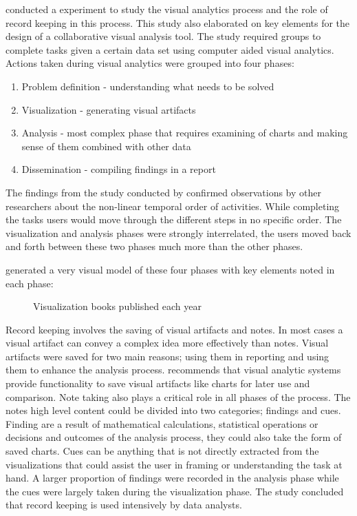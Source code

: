 \cite{mahyar2010closer} conducted a experiment to study the visual analytics process and the role of record keeping in this process. This study also elaborated on key elements for the design of a collaborative visual analysis tool. The study required groups to complete tasks given a certain data set using computer aided visual analytics.
Actions taken during visual analytics were grouped into four phases:
\begin{enumerate}
	\item Problem definition - understanding what needs to be solved
	\item Visualization - generating visual artifacts
	\item Analysis - most complex phase that requires examining of charts and making sense of them combined with other data
	\item Dissemination - compiling findings in a report
\end{enumerate}
The findings from the study conducted by \cite{mahyar2010closer} confirmed observations by other researchers about the non-linear temporal order of activities. While completing the tasks users would move through the different steps in no specific order. The visualization and analysis phases were strongly interrelated, the users moved back and forth between these two phases much more than the other phases.

\cite{mahyar2010closer} generated a very visual model of these four phases with key elements noted in each phase:
\begin{figure}[!ht]
	\centering{}
	\caption{Visualization books published each year}\label{fig:2}
\end{figure}

Record keeping involves the saving of visual artifacts and notes. In most cases a visual artifact can convey a complex idea more effectively than notes. Visual artifacts were saved for two main reasons; using them in reporting and using them to enhance the analysis process.\cite{mahyar2010closer} recommends that visual analytic systems provide functionality to save visual artifacts like charts for later use and comparison. Note taking also plays a critical role in all phases of the process. The notes high level content could be divided into two categories; findings and cues. Finding are a result of mathematical calculations, statistical operations or decisions and outcomes of the analysis process, they could also take the form of saved charts. Cues can be anything that is not directly extracted from the visualizations that could assist the user in framing or understanding the task at hand. A larger proportion of findings were recorded in the analysis phase while the cues were largely taken during the visualization phase. The study concluded that record keeping is used intensively by data analysts.

